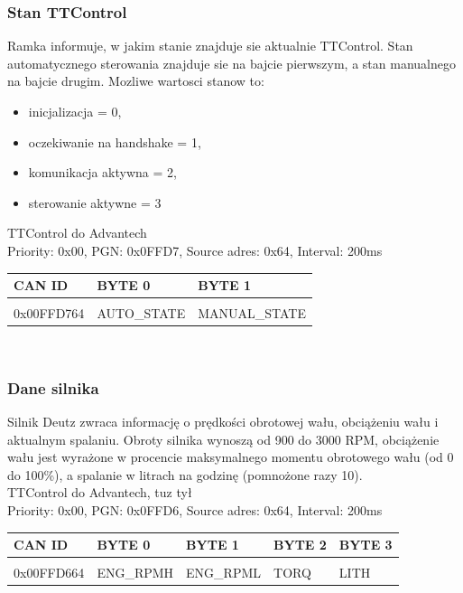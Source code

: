 \documentclass{article}
\begin{document}
\subsubsection{Stan TTControl}
Ramka informuje, w jakim stanie znajduje sie aktualnie TTControl. Stan automatycznego sterowania znajduje sie na bajcie pierwszym, a stan manualnego na bajcie drugim. Mozliwe wartosci stanow to:\\
\begin{itemize}
\item inicjalizacja = 0,
\item oczekiwanie na handshake = 1,
\item komunikacja aktywna = 2,
\item sterowanie aktywne = 3
\end{itemize}
TTControl do Advantech\\
Priority: 0x00, PGN: 0x0FFD7, Source adres: 0x64, Interval: 200ms\\
\begin{left}
\begin{tabular}{ |p{2cm}|p{2.8cm}|p{2.8cm}|} 
 \hline
 CAN ID & BYTE 0 & BYTE 1  \\ \hline
 & & \\
0x00FFD764 & AUTO\_STATE & MANUAL\_STATE \\
 \hline
\end{tabular}
\end{left}\\

\subsubsection{Dane silnika}
Silnik Deutz zwraca informację o prędkości obrotowej wału, obciążeniu wału i aktualnym spalaniu. Obroty silnika wynoszą od 900 do 3000 RPM, obciążenie wału jest wyrażone w procencie maksymalnego momentu obrotowego wału (od 0 do 100\%), a spalanie w litrach na godzinę (pomnożone razy 10).\\

TTControl do Advantech, tuz tył\\
Priority: 0x00, PGN: 0x0FFD6, Source adres: 0x64, Interval: 200ms\\
\begin{left}
\begin{tabular}{ |p{2cm}|p{1.9cm}|p{1.9cm}|p{1.9cm}|p{1.9cm}|} 
 \hline
 CAN ID & BYTE 0 & BYTE 1 & BYTE 2 & BYTE 3  \\ \hline
 & & & & \\
0x00FFD664 & ENG\_RPMH & ENG\_RPML & TORQ & LITH \\
 \hline
\end{tabular}
\end{left}\\
\end{document}
